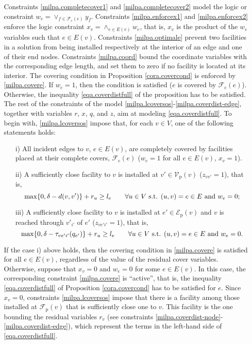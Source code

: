 \documentclass[review]{elsarticle}
\newcommand{\cF}{{\mathcal F}}
\newcommand{\cE}{{\mathcal E}}
\newcommand{\cV}{{\mathcal V}}
\newcommand{\st}{{\text{ s.t. }}}
\newcommand{\dlt}{{\delta}}
\theoremstyle{definition}
\begin{document}
Constraints \eqref{milpa.completecover1} and \eqref{milpa.completecover2} model the logic or constraint $w_e = \lor_{f \in \cF_{\mathrm{c}}(e)} y_f$.  Constraints \eqref{milpa.enforcex1} and \eqref{milpa.enforcex2} enforce the logic constraint  $x_v = \land_{e \in E(v)} w_e$, that is, $x_v$ is the product of the $w_e$ variables such that $e\in E(v)$.  
Constraints \eqref{milpa.optimale} prevent two facilities in a solution from being installed respectively at the interior of an edge and one of their end nodes.
Constraints \eqref{milpa.coord} bound the coordinate variables with the corresponding edge length, and set them to zero if no facility is located at its interior.
The covering condition in Proposition \ref{cora.covercond} is enforced by \eqref{milpa.covere}. If $w_e=1$, then the condition is satisfied ($e$ is covered by $\cF_{\mathrm{c}}(e)$). Otherwise, the inequality \eqref{eqa.coverdistfull} of the proposition has to be satisfied. The rest of the constraints of the model \eqref{milpa.lcoversos}-\eqref{milpa.coverdist-edge}, together with variables $r$, $x$, $q$, and $z$, aim at modeling \eqref{eqa.coverdistfull}. To begin with, \eqref{milpa.lcoversos} impose that, for each $v\in V$,  one of the following statements holds:
\begin{enumerate}
\item[i)] All incident edges to $v$, $e\in E(v)$, are completely covered by facilities placed at their complete covers, $\cF_{\mathrm{c}}(e)$  ($w_e=1$ for all $e\in E(v)$, $x_{v}=1$).
\item[ii)] A sufficiently close facility to $v$ is installed at $v'\in \cV_{\mathrm{p}}(v)$ ($z_{vv'}=1$), that is, $$\max\{0,\dlt-d(v,v')\}+r_u\geq l_e \qquad \forall u\in V \st (u,v)=e\in E \textup{ and }w_e=0;$$
\item[iii)]  A sufficiently close facility to $v$ is installed at $e'\in\cE_{\mathrm{p}}(v)$ and $v$ is reached through $v'_{i'}$ of $e'$ ($z_{ve'i'}=1$), that is, $$\max\{0,\dlt-\tau_{ve'i'}(q_{e'})\}+r_u\geq l_e \qquad \forall u\in V \st (u,v)=e\in E \textup{ and }w_e=0.$$
\end{enumerate}
If the case i) above holds, then the covering condition in \eqref{milpa.covere} is satisfied for all $e\in E(v)$, regardless of the value of the residual cover variables. Otherwise, suppose that $x_v=0$ and $w_e=0$ for some $e\in E(v)$. In this case, the corresponding constraint \eqref{milpa.covere} is ``active'', that is,  the inequality \eqref{eqa.coverdistfull} of Proposition \ref{cora.covercond} has to be satisfied for $e$. Since $x_v=0$, constraints \eqref{milpa.lcoversos} impose that there is a facility among those installed at $\cF_{\mathrm{p}}(v)$ that is sufficiently close one to $v$. This facility is the one bounding the residual variables $r_v$ (see constraints \eqref{milpa.coverdist-node}-\eqref{milpa.coverdist-edge}), which represent the terms in the left-hand side of \eqref{eqa.coverdistfull}.
\end{document}
